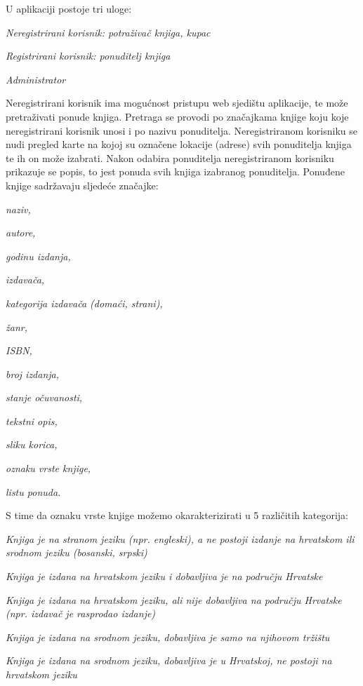         U aplikaciji postoje tri uloge:
        \begin{packed_item}
			\item \textit{Neregistrirani korisnik: potraživač knjiga, kupac}
			\item \textit{Registrirani korisnik: ponuditelj knjiga}
			\item \textit{Administrator }
		\end{packed_item}
        Neregistrirani korisnik ima mogućnost pristupu web sjedištu aplikacije, te može pretraživati ponude knjiga. Pretraga se provodi po značajkama knjige koju koje neregistrirani korisnik unosi i po nazivu ponuditelja. Neregistriranom korisniku se nudi pregled karte na kojoj su označene lokacije (adrese) svih ponuditelja knjiga te ih on može izabrati. Nakon odabira ponuditelja neregistriranom korisniku prikazuje se popis, to jest ponuda svih knjiga izabranog ponuditelja. Ponuđene knjige sadržavaju sljedeće značajke:
        \begin{packed_item}
			\item \textit{naziv,}
			\item \textit{autore,}
			\item \textit{godinu izdanja,}
			\item \textit{izdavača,}
			\item \textit{kategorija izdavača (domaći, strani),}
			\item \textit{žanr,}
            \item \textit{ISBN,}
			\item \textit{broj izdanja,}
			\item \textit{stanje očuvanosti,}
			\item \textit{tekstni opis,}
			\item \textit{sliku korica,}
			\item \textit{oznaku vrste knjige,}
            \item \textit{listu ponuda.}
		\end{packed_item}
        S time da oznaku vrste knjige možemo okarakterizirati u 5 različitih kategorija:
        \begin{packed_item}
			\item \textit{Knjiga je na stranom jeziku (npr. engleski), a ne postoji izdanje na hrvatskom ili srodnom jeziku (bosanski, srpski) }
			\item \textit{Knjiga je izdana na hrvatskom jeziku i dobavljiva je na području Hrvatske}
			\item \textit{Knjiga je izdana na hrvatskom jeziku, ali nije dobavljiva na području Hrvatske (npr. izdavač je rasprodao izdanje)}
			\item \textit{Knjiga je izdana na srodnom jeziku, dobavljiva je samo na njihovom tržištu }
			\item \textit{Knjiga je izdana na srodnom jeziku, dobavljiva je u Hrvatskoj, ne postoji na hrvatskom jeziku}
		\end{packed_item}

